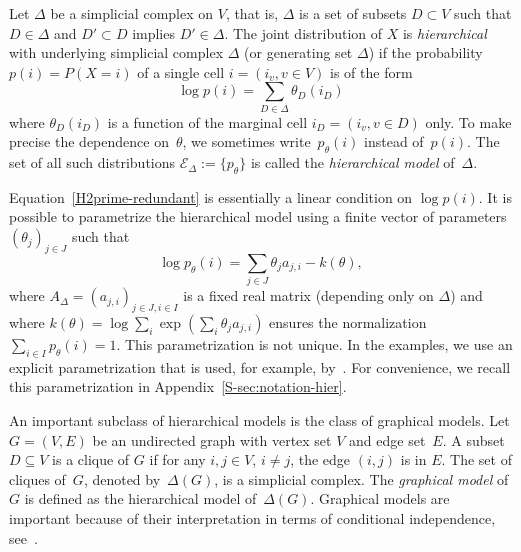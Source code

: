\documentclass[aos,noinfoline]{imsart}
\newcommand{\Ecal}{\mathcal{E}}
\theoremstyle{remark}
\theoremstyle{definition}
\begin{document}
Let ${\Delta}$ be a simplicial complex on $V$, that is, $\Delta$ is a set of subsets $D\subset V$  such that $D\in \Delta$ and $D'\subset D$ implies $D'\in \Delta$.
The joint distribution of $X$ is \emph{hierarchical} with underlying simplicial complex ${\Delta}$ (or generating set $\Delta$)
if the probability $p(i)=P(X=i)$ of a single cell $i=(i_v, v\in V)$ is of the form
\begin{equation}
  \label{H2prime-redundant}
  \log p(i)=\sum_{D\in \Delta} \theta_D(i_D)
\end{equation}
where $\theta_D(i_D)$ is a function of the marginal cell $i_D=(i_v, v\in D)$ only.  To make precise the dependence on~$\theta$, we sometimes write~$p_{\theta}(i)$ instead of~$p(i)$.  The set of all such distributions $\Ecal_{\Delta}:=\{p_{\theta}\}$ is called the \emph{hierarchical model} of~$\Delta$.

Equation~\eqref{H2prime-redundant} is  essentially a linear condition on $\log p(i)$.  It is possible to parametrize the hierarchical model using a finite vector of parameters $(\theta_{j})_{j\in J}$ such that
\begin{equation}
  \label{eq:log-linear}
  \log p_{\theta}(i) = \sum_{j\in J}\theta_{j} a_{j,i} - k(\theta),
\end{equation}
where $A_{\Delta}=(a_{j,i})_{j\in J,i\in I}$ is a fixed real matrix (depending only on $\Delta$) and where
$k(\theta) = \log \sum_{i}\exp(\sum_{i}\theta_{j}a_{j,i})$ ensures the normalization
$\sum_{i\in I}p_{\theta}(i) = 1$.  This parametrization is not unique.  In the examples, we use an explicit
parametrization that is used, for example, by~\cite{LetacMassam12:Bayes_regularization}.  For convenience, we recall
this parametrization in Appendix~\ref{S-sec:notation-hier}.

An important subclass of hierarchical models is the class of graphical models. Let $G=(V,E)$ be an undirected graph with
vertex set $V$ and edge set~$E$.  A subset $D\subseteq V$ is a clique of $G$ if for any $i,j\in V$, $i\neq j$, the
edge $(i,j)$ is in $E$.  The set of cliques of~$G$, denoted by~$\Delta(G)$, is a simplicial complex.  The \emph{graphical
  model} of $G$ is defined as the hierarchical model of~$\Delta(G)$.  Graphical models are important because of their
interpretation in terms of conditional independence, see~\cite{Lauritzen:Graphical_models}.



\end{document}
